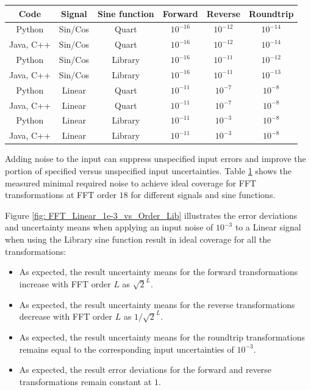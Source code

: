 \documentclass[twoside]{article}
\numberwithin{equation}{section}
\begin{document}
\begin{table}
\centering
\begin{tabular}{|c|c|c|c|c|c|} 
\hline 
Code         & Signal     & Sine function & Forward       & Reverse       & Roundtrip    \\ 
\hline 
Python      & Sin/Cos   & Quart           & $10^{-16}$  & $10^{-12}$ & $10^{-14}$ \\ 
\hline 
Java, C++ & Sin/Cos   & Quart           & $10^{-16}$  & $10^{-12}$ & $10^{-14}$ \\ 
\hline 
Python      & Sin/Cos   & Library         & $10^{-16}$  & $10^{-11}$ & $10^{-12}$ \\ 
\hline 
Java, C++ & Sin/Cos   & Library         & $10^{-16}$  & $10^{-11}$ & $10^{-13}$ \\ 
\hline 
Python      & Linear     & Quart           & $10^{-11}$  & $10^{-7}$   & $10^{-8}$ \\
\hline 
Java, C++ & Linear     & Quart           & $10^{-11}$  & $10^{-7}$   & $10^{-8}$ \\
\hline 
Python      & Linear     & Library         & $10^{-11}$  & $10^{-3}$   & $10^{-8}$  \\
\hline 
Java, C++ & Linear     & Library         & $10^{-11}$  & $10^{-3}$   & $10^{-8}$  \\
\hline 
\end{tabular}
\label{tbl: ideal coverage}
\end{table}


Adding noise to the input can suppress unspecified input errors and improve the portion of specified versus unspecified input uncertainties.
Table \ref{tbl: ideal coverage} shows the measured minimal required noise to achieve ideal coverage for FFT transformations at FFT order $18$ for different signals and sine functions.

Figure \ref{fig:  FFT_Linear_1e-3_vs_Order_Lib} illustrates the error deviations and uncertainty means when applying an input noise of $10^{-3}$ to a Linear signal when using the Library sine function result in ideal coverage for all the transformations:
\begin{itemize}
\item As expected, the result uncertainty means for the forward transformations increase with FFT order $L$ as $\sqrt{2}^L$.

\item As expected, the result uncertainty means for the reverse transformations decrease with FFT order $L$ as $1/\sqrt{2}^L$.

\item As expected, the result uncertainty means for the roundtrip transformations remains equal to the corresponding input uncertainties of $10^{-3}$.

\item As expected, the result error deviations for the forward and reverse transformations remain constant at $1$.

\end{itemize}
\end{document}
